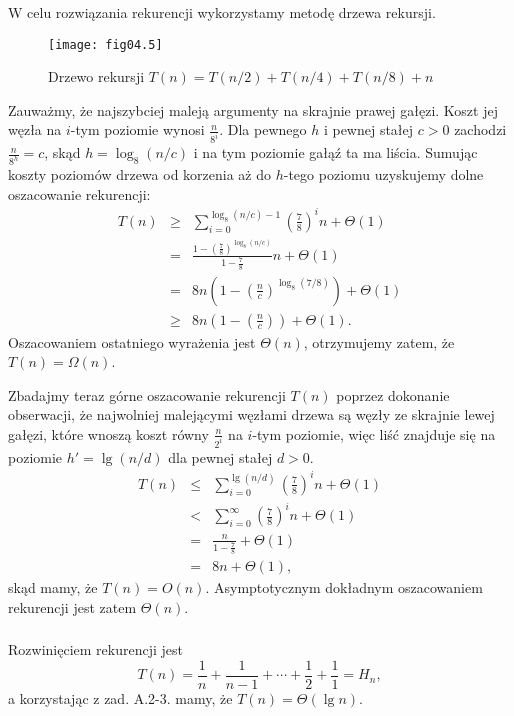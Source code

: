 \subsubsection{} %
W celu rozwiązania rekurencji wykorzystamy metodę drzewa rekursji.
\begin{figure}[h]
	\begin{center}
		\texttt{[image: fig04.5]}
	\end{center}
	\caption{Drzewo rekursji $T(n)=T(n/2)+T(n/4)+T(n/8)+n$} \label{fig:4-4f}
\end{figure}
Zauważmy, że najszybciej maleją argumenty na skrajnie prawej gałęzi. Koszt jej węzła na $i$-tym poziomie wynosi $\frac{n}{8^i}$. Dla pewnego $h$ i pewnej stałej $c>0$ zachodzi $\frac{n}{8^h}=c$, skąd $h=\log_8(n/c)$ i na tym poziomie gałąź ta ma liścia. Sumując koszty poziomów drzewa od korzenia aż do $h$-tego poziomu uzyskujemy dolne oszacowanie rekurencji:
\begin{eqnarray*}
	T(n) &\ge& \sum_{i=0}^{\log_8(n/c)-1}\left(\frac{7}{8}\right)^in+\Theta(1) \\
	&=& \frac{1-\left(\frac{7}{8}\right)^{\log_8(n/c)}}{1-\frac{7}{8}}n+\Theta(1) \\
	&=& 8n\left(1-\left(\frac{n}{c}\right)^{\log_8(7/8)}\right)+\Theta(1) \\
	&\ge& 8n\left(1-\left(\frac{n}{c}\right)\right)+\Theta(1).
\end{eqnarray*}
Oszacowaniem ostatniego wyrażenia jest $\Theta(n)$, otrzymujemy zatem, że $T(n)=\Omega(n)$.

Zbadajmy teraz górne oszacowanie rekurencji $T(n)$ poprzez dokonanie obserwacji, że najwolniej malejącymi węzłami drzewa są węzły ze skrajnie lewej gałęzi, które wnoszą koszt równy $\frac{n}{2^i}$ na $i$-tym poziomie, więc liść znajduje się na poziomie $h'=\lg (n/d)$ dla pewnej stałej $d>0$.
\begin{eqnarray*}
	T(n) &\le& \sum_{i=0}^{\lg (n/d)}\left(\frac{7}{8}\right)^in+\Theta(1) \\
	&<& \sum_{i=0}^\infty\left(\frac{7}{8}\right)^in+\Theta(1) \\
	&=& \frac{n}{1-\frac{7}{8}}+\Theta(1) \\
	&=& 8n+\Theta(1),
\end{eqnarray*}
skąd mamy, że $T(n)=O(n)$. Asymptotycznym dokładnym oszacowaniem rekurencji jest zatem $\Theta(n)$.

\subsubsection{} %
Rozwinięciem rekurencji jest
\[
	T(n) = \frac{1}{n}+\frac{1}{n-1}+\cdots +\frac{1}{2}+\frac{1}{1} = H_n,
\]
a korzystając z zad. A.2-3. mamy, że $T(n)=\Theta(\lg n)$.

